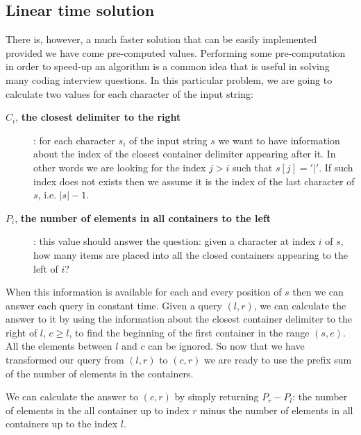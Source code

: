 \subsection{Linear time solution}
\label{items_in_containers_amazon:sec:lineartime}
There is, however, a much faster solution that can be easily implemented provided we
have come pre-computed values. Performing some pre-computation in order to speed-up an algorithm is a
common idea that is useful in solving many coding interview questions. In this particular
problem, we are going to calculate two values for each character of the input string:
\begin{description}
	\item[$C_i$, \textbf{the closest delimiter to the right}]: for each character $s_i$ of
	the input string $s$ we want to have information about the index of the closest container delimiter
	appearing after it. In other words we are looking for the index $j > i$ such that $s[j]='|'$. If
	such index does not exists then we assume it is the index of the last character of $s$, i.e.
	$|s|-1$.
	\item[$P_i$,  \textbf{the number of elements in all containers to the left}]: this value should answer
	the question: given a character at index $i$ of $s$, how many items are placed into all the
	closed containers appearing to the left of $i$? 
\end{description}
When this information is available for each and every position of $s$ then we can answer each query in constant time.
Given a query $(l,r)$, we can calculate the answer to it by using the information about 
the closest container delimiter to the right of $l$, $c\geq l$,
to find the beginning of the first container in the range $(s,e)$. All the elements 
between $l$ and $c$ can be ignored.
So now that we have transformed our query from $(l,r)$ to $(c,r)$ we are ready to use the prefix sum of the number of elements 
in the containers.

We can calculate the answer to $(c,r)$ by simply returning  $P_r - P_l$: the number of elements in the all container up to index $r$ minus 
the number of elements in all containers up to the index $l$. 


